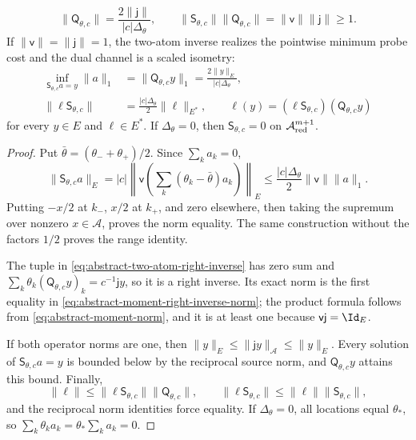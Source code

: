 \begin{proposition}
\begin{equation}
 \|\mathsf Q_{\theta,c}\|
 =\frac{2\|\mathsf j\|}{|c|\Delta_\theta},
 \qquad
 \|\mathsf S_{\theta,c}\|\|\mathsf Q_{\theta,c}\|
 =\|\mathsf v\|\|\mathsf j\|\ge1.                \label{eq:abstract-moment-right-inverse-norm}
\end{equation}
If \(\|\mathsf v\|=\|\mathsf j\|=1\), the two-atom inverse realizes
the pointwise minimum probe cost and the dual channel is a scaled isometry:
\begin{align}
 \inf_{\mathsf S_{\theta,c}a=y}\|a\|_1
 &=\|\mathsf Q_{\theta,c}y\|_1
   =\frac{2\|y\|_E}{|c|\Delta_\theta},             \label{eq:abstract-moment-optimal-cost}\\
 \|\ell\mathsf S_{\theta,c}\|
 &=\frac{|c|\Delta_\theta}{2}\|\ell\|_{E^*},
 \qquad
 \ell(y)=(\ell\mathsf S_{\theta,c})(\mathsf Q_{\theta,c}y) \label{eq:abstract-moment-dual-isometry}
\end{align}
for every \(y\in E\) and \(\ell\in E^*\).  If
\(\Delta_\theta=0\), then \(\mathsf S_{\theta,c}=0\) on
\(\mathcal A_{\rm red}^{m+1}\).
\end{proposition}

\begin{proof}
Put \(\bar\theta=(\theta_-+\theta_+)/2\).  Since \(\sum_ka_k=0\),
\[
 \|\mathsf S_{\theta,c}a\|_E
 =|c|\left\|\mathsf v\!\left(
       \sum_k(\theta_k-\bar\theta)a_k\right)\right\|_E
 \le\frac{|c|\Delta_\theta}{2}\|\mathsf v\|\|a\|_1.
\]
Putting \(-x/2\) at \(k_-\), \(x/2\) at \(k_+\), and zero elsewhere,
then taking the supremum over nonzero \(x\in\mathcal A\), proves the norm
equality.  The same construction without the factors \(1/2\) proves the
range identity.

The tuple in \cref{eq:abstract-two-atom-right-inverse} has zero sum and
\(\sum_k\theta_k(\mathsf Q_{\theta,c}y)_k=c^{-1}\mathsf j y\), so it is a
right inverse.  Its exact norm is the first equality in
\cref{eq:abstract-moment-right-inverse-norm}; the product formula follows
from \cref{eq:abstract-moment-norm}, and it is at least one because
\(\mathsf v\mathsf j=\Id_E\).

If both operator norms are one, then
\(\|y\|_E\le\|\mathsf j y\|_{\mathcal A}\le\|y\|_E\).  Every solution
of \(\mathsf S_{\theta,c}a=y\) is bounded below by the reciprocal source
norm, and \(\mathsf Q_{\theta,c}y\) attains this bound.  Finally,
\[
 \|\ell\|
 \le\|\ell\mathsf S_{\theta,c}\|\|\mathsf Q_{\theta,c}\|,
 \qquad
 \|\ell\mathsf S_{\theta,c}\|
 \le\|\ell\|\|\mathsf S_{\theta,c}\|,
\]
and the reciprocal norm identities force equality.  If
\(\Delta_\theta=0\), all locations equal \(\theta_*\), so
\(\sum_k\theta_ka_k=\theta_*\sum_ka_k=0\).
\end{proof}

